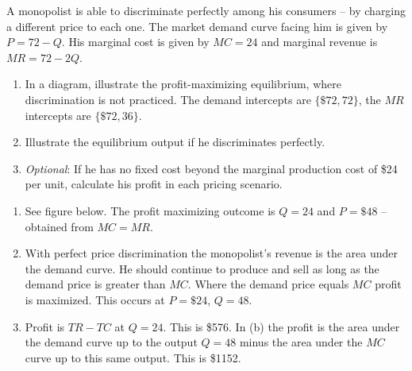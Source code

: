 \begin{enumialphparenastyle}
\begin{econex}\label{ex:ch10ex5}
A monopolist is able to discriminate perfectly among his consumers -- by charging a different price to each one. The market demand curve facing him is given by $P=72-Q$. His marginal cost is given by $MC=24$ and marginal revenue is $MR=72-2Q$.
\begin{enumerate}
\item	In a diagram, illustrate the profit-maximizing equilibrium, where discrimination is not practiced. The demand intercepts are $\{\$72,72\}$, the $MR$ intercepts are $\{\$72,36\}$.
\item	Illustrate the equilibrium output if he discriminates perfectly.
\item	\textit{Optional}: If he has no fixed cost beyond the marginal production cost of \$24 per unit, calculate his profit in each pricing scenario.
\end{enumerate}
\begin{econsolution}
\begin{enumerate}
\item	See figure below. The profit maximizing outcome is $Q=24$ and $P=\$48$ -- obtained from $MC=MR$.
\item	With perfect price discrimination the monopolist's revenue is the area under the demand curve. He should continue to produce and sell as long as the demand price is greater than $MC$. Where the demand price equals $MC$ profit is maximized. This occurs at $P=\$24$, $Q=48$.
\item	Profit is $TR-TC$ at $Q=24$. This is \$576. In (b) the profit is the area under the demand curve up to the output $Q=48$ minus the area under the $MC$ curve up to this same output. This is \$1152.
\end{enumerate}
\begin{center}
\end{center}
\end{econsolution}
\end{econex}


\end{enumialphparenastyle}
